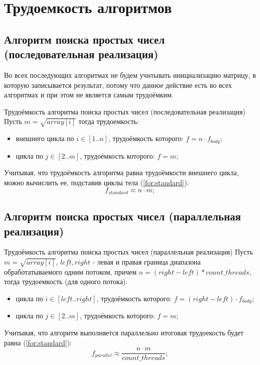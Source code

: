\section{Трудоемкость алгоритмов}

\subsection{Алгоритм поиска простых чисел (последовательная реализация)}

Во всех последующих алгоритмах не будем учитывать инициализацию матрицу, в которую записывается результат, потому что данное действие есть во всех алгоритмах и при этом не является самым трудоёмким.

Трудоёмкость алгоритма поиска простых чисел (последовательная реализация) 
Пусть $ m = \sqrt{array[i]}$ тогда трудоемкость:
\begin{itemize}
    \item внешнего цикла по $i \in [1..n]$, трудоёмкость которого: $f = n \cdot f_{body}$;
    \item цикла по $j \in [2..m]$, трудоёмкость которого: $f = m$;
\end{itemize}

Учитывая, что трудоёмкость алгоритма равна трудоёмкости внешнего цикла, можно вычислить ее, подставив циклы тела (\ref{for:standard}):
\begin{equation}
    \label{for:standard}
    f_{standard} \approx n \cdot m;
\end{equation}



\subsection{Алгоритм поиска простых чисел (параллельная реализация)}

Трудоёмкость алгоритма поиска простых чисел (параллельная реализация) 
Пусть $ m = \sqrt{array[i]}$, $left, right$ - левая и правая граница диапазона обработатываемого одним потоком, причем $n = (right - left) * count\_threads$, тогда трудоемкость (для одного потока): 
\begin{itemize}
    \item цикла по $i \in [left..right]$, трудоёмкость которого: $f = (right - left) \cdot f_{body}$;
    \item цикла по $j \in [2..m]$, трудоёмкость которого: $f = m$;
\end{itemize}

Учитывая, что алгоритм выполняется параллельно итоговая трудоекость будет равна (\ref{for:standard}):
\begin{equation}
    \label{for:standard}
    f_{parallel} \approx \frac{n \cdot m}{count\_threads};
\end{equation}


